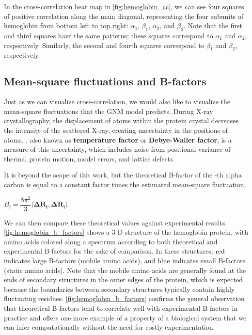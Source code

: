 In the cross-correlation heat map in \autoref{fig:hemoglobin_cc}, we can see four squares of positive correlation along the main diagonal, representing the four subunits of hemoglobin from bottom left to top right: $\alpha_1$, $\beta_1$, $\alpha_2$, and $\beta_2$. Note that the first and third squares have the same patterns; these squares correspond to $\alpha_1$ and $\alpha_2$, respectively. Similarly, the second and fourth squares correspond to $\beta_1$ and $\beta_2$, respectively.\\

\begin{qbox}\end{qbox}

\FloatBarrier
{}
\subsection{Mean-square fluctuations and B-factors}

Just as we can visualize cross-correlation, we would also like to visualize the mean-square fluctuations that the GNM model predicts. During X-ray crystallography, the displacement of atoms within the protein crystal decreases the intensity of the scattered X-ray, creating uncertainty in the positions of atoms. , also known as \textbf{temperature factor} or \textbf{Debye-Waller factor}, is a measure of this uncertainty, which includes noise from positional variance of thermal protein motion, model errors, and lattice defects.

It is beyond the scope of this work, but the theoretical B-factor of the -th alpha carbon is equal to a constant factor times the estimated mean-square fluctuation,

\begin{center}
$ B_i = \dfrac{8 \pi^2}{3} \langle \mathbf{\Delta R_i}, \mathbf{\Delta R_i} \rangle$\,.
\end{center}

We can then compare these theoretical values against experimental results. \autoref{fig:hemoglobin_b_factors} shows a 3-D structure of the hemoglobin protein, with amino acids colored along a spectrum according to both theoretical and experimental B-factors for the sake of comparison. In these structures, red indicates large B-factors (mobile amino acids), and blue indicates small B-factors (static amino acids). Note that the mobile amino acids are generally found at the ends of secondary structures in the outer edges of the protein, which is expected because the boundaries between secondary structures typically contain highly fluctuating residues. \autoref{fig:hemoglobin_b_factors} confirms the general observation that theoretical B-factors tend to correlate well with experimental B-factors in practice and offers one more example of a property of a biological system that we can infer computationally without the need for costly experimentation.\\

